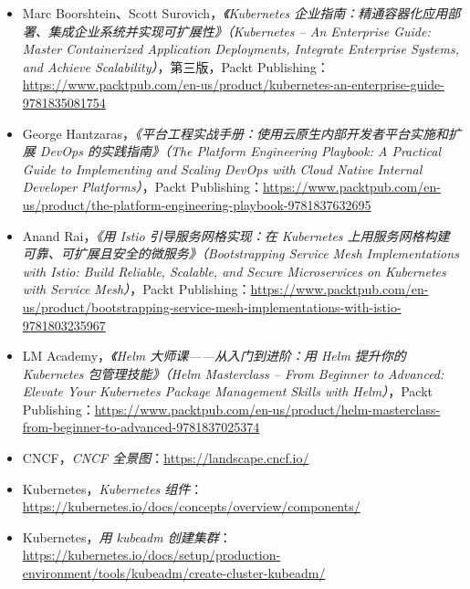\begin{itemize}
\item Marc Boorshtein、Scott Surovich，\emph{《Kubernetes 企业指南：精通容器化应用部署、集成企业系统并实现可扩展性》（Kubernetes – An Enterprise Guide: Master Containerized Application Deployments, Integrate Enterprise Systems, and Achieve Scalability）}，第三版，Packt Publishing：\href{https://www.packtpub.com/en-us/product/kubernetes-an-enterprise-guide-9781835081754}{https://www.packtpub.com/en-us/product/kubernetes-an-enterprise-guide-9781835081754}
\item George Hantzaras，\emph{《平台工程实战手册：使用云原生内部开发者平台实施和扩展 DevOps 的实践指南》（The Platform Engineering Playbook: A Practical Guide to Implementing and Scaling DevOps with Cloud Native Internal Developer Platforms）}，Packt Publishing：\href{https://www.packtpub.com/en-us/product/the-platform-engineering-playbook-9781837632695}{https://www.packtpub.com/en-us/product/the-platform-engineering-playbook-9781837632695}
\item Anand Rai，\emph{《用 Istio 引导服务网格实现：在 Kubernetes 上用服务网格构建可靠、可扩展且安全的微服务》（Bootstrapping Service Mesh Implementations with Istio: Build Reliable, Scalable, and Secure Microservices on Kubernetes with Service Mesh）}，Packt Publishing：\href{https://www.packtpub.com/en-us/product/bootstrapping-service-mesh-implementations-with-istio-9781803235967}{https://www.packtpub.com/en-us/product/bootstrapping-service-mesh-implementations-with-istio-9781803235967}
\item LM Academy，\emph{《Helm 大师课——从入门到进阶：用 Helm 提升你的 Kubernetes 包管理技能》（Helm Masterclass – From Beginner to Advanced: Elevate Your Kubernetes Package Management Skills with Helm）}，Packt Publishing：\href{https://www.packtpub.com/en-us/product/helm-masterclass-from-beginner-to-advanced-9781837025374}{https://www.packtpub.com/en-us/product/helm-masterclass-from-beginner-to-advanced-9781837025374}
\item CNCF，\emph{CNCF 全景图}：\href{https://landscape.cncf.io/}{https://landscape.cncf.io/}
\item Kubernetes，\emph{Kubernetes 组件}：\href{https://kubernetes.io/docs/concepts/overview/components/}{https://kubernetes.io/docs/concepts/overview/components/}
\item Kubernetes，\emph{用 kubeadm 创建集群}：\href{https://kubernetes.io/docs/setup/production-environment/tools/kubeadm/create-cluster-kubeadm/}{https://kubernetes.io/docs/setup/production-environment/tools/kubeadm/create-cluster-kubeadm/}

\end{itemize}
